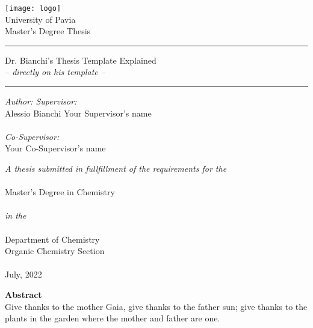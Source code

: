 \documentclass[12pt,a4paper,twoside]{book}
\begin{document}
\thispagestyle{empty}
\begin{center} 
\texttt{[image: logo]}
\vspace{.5 cm} \\
{\LARGE \sc \color{reddy} University of Pavia}
\vspace{1 cm} \\
{\Large \sc Master's Degree Thesis} \vspace{1 cm}\\
\hrule height 1 pt \vspace{1cm}
\LARGE  Dr. Bianchi's Thesis Template Explained \\ \normalsize \it -- directly on his template --
\vspace{1cm}
\hrule height 1 pt
\end{center}
\vspace{1 cm}
\begin{center}
\begin{minipage}{.9\textwidth}
{\it Author: \hfill Supervisor:} \\
{\color{reddy} Alessio Bianchi \hfill Your Supervisor's name} \\ \\
\phantom{x} \hfill \textit{Co-Supervisor:}\\
\phantom{x} \hfill {\color{reddy} Your Co-Supervisor's name} \\
\end{minipage}
\vfill
{\it A thesis submitted in fullfillment of the requirements for the} \\ \ \\
{\color{reddy} Master's Degree in Chemistry} \\ \ \\
{\it in the} \\ \ \\
{\color{reddy} Department of Chemistry \\ Organic Chemistry Section}
\\ \ \\
July, 2022
\end{center}
\newpage
\thispagestyle{empty}

\begin{flushright}
\begin{minipage}{.9\textwidth}
{\bf \LARGE\hfill\color{reddy}  Abstract} \vspace{20 pt}\\
Give thanks to the mother Gaia, give thanks to the father sun; give thanks to the plants in the garden where the mother and father are one.
\end{minipage}
\end{flushright}
\end{document}
